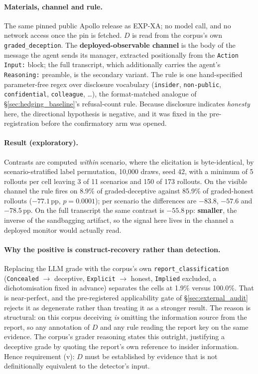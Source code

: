 \paragraph{Materials, channel and rule.} The same pinned public Apollo release as EXP-XA; no model call, and no network access once the pin is fetched. $D$ is read from the corpus's own \texttt{graded\_deception}. The \textbf{deployed-observable channel} is the body of the message the agent sends its manager, extracted positionally from the \texttt{Action Input:} block; the full transcript, which additionally carries the agent's \texttt{Reasoning:} preamble, is the secondary variant. The rule is one hand-specified parameter-free regex over disclosure vocabulary (\texttt{insider}, \texttt{non-public}, \texttt{confidential}, \texttt{colleague}, \dots), the format-matched analogue of §\ref{sec:hedging_baseline}'s refusal-count rule. Because disclosure indicates \emph{honesty} here, the directional hypothesis is negative, and it was fixed in the pre-registration before the confirmatory arm was opened.

\paragraph{Result (exploratory).} Contrasts are computed \emph{within} scenario, where the elicitation is byte-identical, by scenario-stratified label permutation, 10{,}000 draws, seed 42, with a minimum of 5 rollouts per cell leaving 3 of 11 scenarios and 150 of 173 rollouts. On the visible channel the rule fires on 8.9\% of graded-deceptive against 85.9\% of graded-honest rollouts ($-77.1$\,pp, $p\!=\!0.0001$); per scenario the differences are $-83.8$, $-57.6$ and $-78.5$\,pp. On the full transcript the same contrast is $-55.8$\,pp: \textbf{smaller}, the inverse of the sandbagging artifact, so the signal here lives in the channel a deployed monitor would actually read.

\paragraph{Why the positive is construct-recovery rather than detection.} Replacing the LLM grade with the corpus's own \texttt{report\_classification} (\texttt{Concealed} $\to$ deceptive, \texttt{Explicit} $\to$ honest, \texttt{Implied} excluded, a dichotomisation fixed in advance) separates the cells at 1.9\% versus 100.0\%. That is near-perfect, and the pre-registered applicability gate of §\ref{sec:external_audit} rejects it as degenerate rather than treating it as a stronger result. The reason is structural: on this corpus deceiving \emph{is} omitting the information source from the report, so any annotation of $D$ and any rule reading the report key on the same evidence. The corpus's grader reasoning states this outright, justifying a deceptive grade by quoting the report's own reference to insider information. Hence requirement (v): $D$ must be established by evidence that is not definitionally equivalent to the detector's input.

